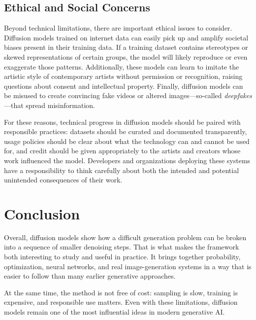 \documentclass[a4paper,12pt]{article}
\begin{document}
\subsection{Ethical and Social Concerns}
Beyond technical limitations, there are important ethical issues to consider. Diffusion models trained on internet data can easily pick up and amplify societal biases present in their training data. If a training dataset contains stereotypes or skewed representations of certain groups, the model will likely reproduce or even exaggerate those patterns. Additionally, these models can learn to imitate the artistic style of contemporary artists without permission or recognition, raising questions about consent and intellectual property. Finally, diffusion models can be misused to create convincing fake videos or altered images---so-called \textit{deepfakes}---that spread misinformation.

For these reasons, technical progress in diffusion models should be paired with responsible practices: datasets should be curated and documented transparently, usage policies should be clear about what the technology can and cannot be used for, and credit should be given appropriately to the artists and creators whose work influenced the model. Developers and organizations deploying these systems have a responsibility to think carefully about both the intended and potential unintended consequences of their work.

\section{Conclusion}
Overall, diffusion models show how a difficult generation problem can be broken into a sequence of smaller denoising steps. That is what makes the framework both interesting to study and useful in practice. It brings together probability, optimization, neural networks, and real image-generation systems in a way that is easier to follow than many earlier generative approaches.

At the same time, the method is not free of cost: sampling is slow, training is expensive, and responsible use matters. Even with these limitations, diffusion models remain one of the most influential ideas in modern generative AI.

\newpage


\end{document}
